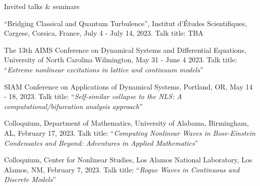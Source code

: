 \documentclass[10pt]{article} %
\newenvironment{innerlist}[1][\enskip\textbullet]%
        {\begin{compactitem}[#1]}{\end{compactitem}}
\newenvironment{benumerate}[1]{
    \let\oldItem\item
    \def\item{\addtocounter{enumi}{-2}\oldItem}
    \begin{enumerate}
    \setcounter{enumi}{#1}
    \addtocounter{enumi}{1}
}{
    \end{enumerate}
}
\begin{document}

\begin{section}{Invited talks \& seminars}
\begin{innerlist}
\setlength\itemsep{1em}
\item \vskip -4.3mm ``Bridging Classical and Quantum Turbulence'',
Institut d'\'Etudes Scientifiques, Cargese, Corsica, France, July 4 - July 14, 2023.
Talk title: TBA


\item The 13th AIMS Conference on Dynamical Systems and Differential Equations, University of North Carolina Wilmington, %
May 31 - June 4 2023. Talk title: ``\textit{Extreme nonlinear excitations in lattice and continuum models}''

\item SIAM Conference on Applications of Dynamical Systems, Portland, OR, May 14 - 18, 2023. 
Talk title: ``\textit{Self-similar collapse to the NLS: A computational/bifurcation analysis approach}''

\item Colloquium, Department of Mathematics, University of Alabama, Birmingham, AL, February 17, 2023. 
Talk title: ``\textit{Computing Nonlinear Waves in Bose-Einstein Condensates and Beyond: Adventures in 
Applied Mathematics}''

\item Colloquium, Center for Nonlinear Studies, Los Alamos National Laboratory, Los Alamos, NM, February 7, 2023. 
      Talk title: ``\textit{Rogue Waves in Continuous and Discrete Models}''


\end{innerlist}
\end{section}
\end{document}
